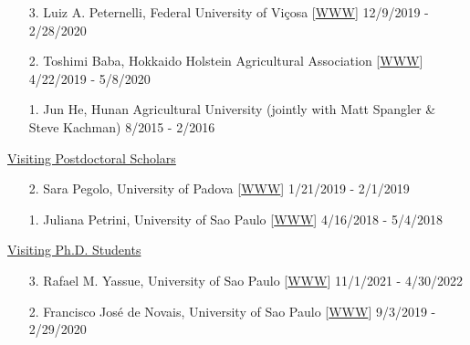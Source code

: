 \documentclass[margin,line,10pt]{res}
\begin{document}
\begin{resume}
\begin{enumerate}
\item [3.] Luiz A. Peternelli, Federal University of Vi\c cosa [\textcolor{blue}{\href{http://www.dpi.ufv.br/~peternelli/}{WWW}}]  \hfill 12/9/2019 - 2/28/2020

  \vspace{0.3cm}

      
\item [2.] Toshimi Baba, Hokkaido Holstein Agricultural Association [\textcolor{blue}{\href{https://researchmap.jp/t-baba/?lang=english}{WWW}}]  \hfill  4/22/2019 - 5/8/2020
  
  \vspace{0.3cm}

\item [1.] Jun He, Hunan Agricultural University (jointly with Matt Spangler \& Steve Kachman)  \hfill  8/2015 - 2/2016 
\end{enumerate}



\begin{flushleft}
\hspace{0.2cm} \underline{Visiting Postdoctoral Scholars}
\end{flushleft}
\begin{enumerate}
\item [2.] Sara Pegolo,  University of Padova [\textcolor{blue}{\href{https://www.researchgate.net/profile/Sara_Pegolo}{WWW}}]  \hfill 1/21/2019 - 2/1/2019
  
  \vspace{0.3cm}

\item [1.] Juliana Petrini,  University of Sao Paulo  [\textcolor{blue}{\href{https://www.researchgate.net/profile/Juliana_Petrini}{WWW}}]  \hfill  4/16/2018 - 5/4/2018
\end{enumerate}






\begin{flushleft}
\hspace{0.2cm} \underline{Visiting Ph.D. Students}
\end{flushleft}
\begin{enumerate}
\item [3.] Rafael M. Yassue,  University of Sao Paulo [\textcolor{blue}{\href{https://rafaelyassue.github.io/cv-online/}{WWW}}]  \hfill  11/1/2021 - 4/30/2022

    
\item [2.] Francisco Jos\'{e} de Novais,  University of Sao Paulo [\textcolor{blue}{\href{https://fjnovais.github.io/}{WWW}}]  \hfill  9/3/2019 - 2/29/2020


\end{enumerate}
\end{resume}
\end{document}
